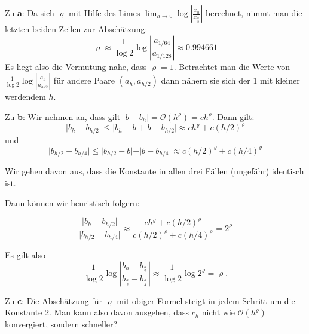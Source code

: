 \begin{solution}
	Zu \textbf{a}: Da sich $\varrho$ mit Hilfe des Limes $\lim_{h\to 0} \log\left|\frac{x_h}{x_{\frac h2}}\right|$
	berechnet, nimmt man die letzten beiden Zeilen zur Abschätzung:
	\begin{equation}
		\varrho \approx \frac{1}{\log 2} \log \left|\frac{a_{1/64}}{a_{1/128}}\right| \approx 0.994661
	\end{equation}
	Es liegt also die Vermutung nahe, dass $\varrho = 1$.
	Betrachtet man die Werte von $\frac{1}{\log 2} \log \left|\frac{a_{h}}{a_{h/2}}\right|$ für andere Paare $(a_h,a_{h/2})$ dann nähern sie sich der 1 mit kleiner werdendem $h$.
	
	Zu \textbf{b}:
	Wir nehmen an, dass gilt $\vert b-b_h \vert=\mathcal{O}(h^{\varrho})=ch^{\varrho}$.
	Dann gilt:
	\begin{equation}
		\vert b_h - b_{h/2}\vert \leq \vert b_h- b\vert + \vert b-b_{h/2}\vert \approx ch^{\varrho} + c(h/2)^{\varrho}
	\end{equation}
	und 
	\begin{equation}
	\vert b_{h/2} - b_{h/4}\vert \leq \vert b_{h/2}- b\vert + \vert b-b_{h/4}\vert \approx c(h/2)^{\varrho} + c(h/4)^{\varrho}
	\end{equation}
	
	Wir gehen davon aus, dass die Konstante in allen drei Fällen (ungefähr) identisch ist.
	
	Dann können wir heuristisch folgern:
	
	\begin{equation}
		\frac{\vert b_h - b_{h/2}\vert}{\vert b_{h/2} - b_{h/4}\vert} \approx \frac{ch^{\varrho} + c(h/2)^{\varrho}}{c(h/2)^{\varrho}+ c(h/4)^{\varrho}} = 2^{\varrho}
	\end{equation}
	
	Es gilt also 
	\begin{equation}
		\frac1{\log 2}
		\log \left|\frac{b_h - b_{\frac h2}}{b_{\frac h2} -b_{\frac h4}}\right| \approx 
		\frac1{\log 2}\log 2^{\varrho} = \varrho.
	\end{equation}
	
	
	Zu \textbf{c}: Die Abschätzung für $\varrho$ mit obiger Formel steigt in jedem Schritt um die Konstante 2. Man kann also davon ausgehen, dass $c_h$ nicht wie $\mathcal{O}(h^{\varrho})$ konvergiert, sondern schneller?
	

\end{solution}